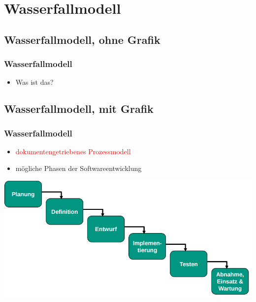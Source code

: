 \documentclass[18pt]{beamer}
\begin{document}
\section{Wasserfallmodell}
	\subsection{Wasserfallmodell, ohne Grafik}
	\begin{frame}
		\frametitle{Wasserfallmodell}
		\begin{itemize}
			\item Was ist das? 
		\end{itemize}
	\end{frame}
	
	\subsection{Wasserfallmodell, mit Grafik}
	\begin{frame}
		\frametitle{Wasserfallmodell}
		\begin{itemize}
			\item \textcolor{red}{dokumentengetriebenes Prozessmodell} \pause
			\item mögliche Phasen der Softwareentwicklung \pause
		\end{itemize}
		\includegraphics[scale=0.4]{./pics/tut1/waterfall_without-docs.png}
	\end{frame}
	
\end{document}
